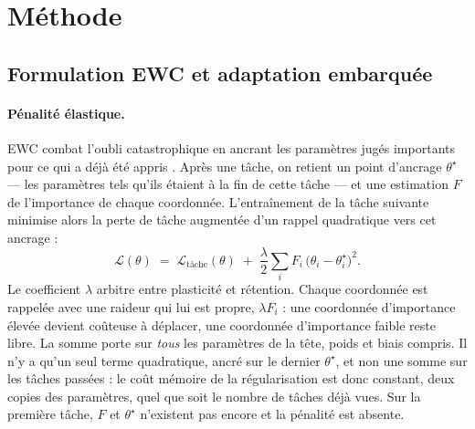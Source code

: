 \section{Méthode}
\label{sec:method}

\subsection{Formulation EWC et adaptation embarquée}
\label{sec:ewc_formulation}

\paragraph{Pénalité élastique.} EWC combat l'oubli catastrophique en ancrant les paramètres jugés
importants pour ce qui a déjà été appris \cite{Kirkpatrick2017EWC}. Après une tâche, on retient un
point d'ancrage $\theta^\star$ --- les paramètres tels qu'ils étaient à la fin de cette tâche --- et
une estimation $F$ de l'importance de chaque coordonnée. L'entraînement de la tâche suivante minimise
alors la perte de tâche augmentée d'un rappel quadratique vers cet ancrage :
\begin{equation}
\label{eq:ewc_loss}
\mathcal{L}(\theta) \;=\; \mathcal{L}_{\text{tâche}}(\theta)
\;+\; \frac{\lambda}{2} \sum_{i} F_i \,\bigl(\theta_i - \theta^\star_i\bigr)^2 .
\end{equation}
Le coefficient $\lambda$ arbitre entre plasticité et rétention. Chaque coordonnée est rappelée avec
une raideur qui lui est propre, $\lambda F_i$ : une coordonnée d'importance élevée devient coûteuse à
déplacer, une coordonnée d'importance faible reste libre. La somme porte sur \emph{tous} les
paramètres de la tête, poids et biais compris. Il n'y a qu'un seul terme quadratique, ancré sur le
dernier $\theta^\star$, et non une somme sur les tâches passées : le coût mémoire de la
régularisation est donc constant, deux copies des paramètres, quel que soit le nombre de tâches déjà
vues. Sur la première tâche, $F$ et $\theta^\star$ n'existent pas encore et la pénalité est absente.

